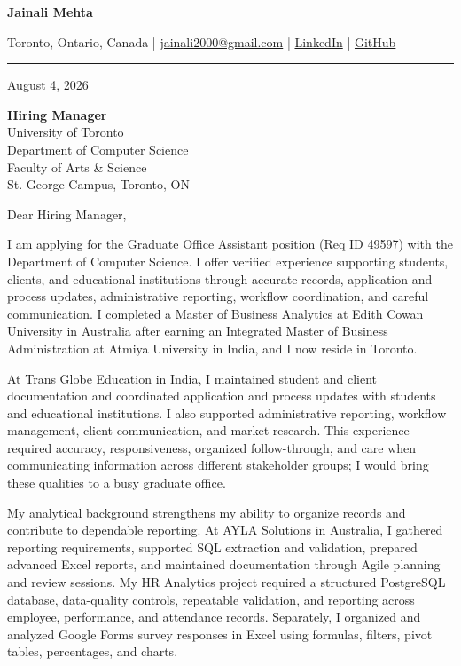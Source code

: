 \documentclass[letterpaper,10pt]{article}
\begin{document}
\begin{center}
  {\fontsize{17}{19}\selectfont\textbf{Jainali Mehta}}\par\vspace{2pt}
  \small Toronto, Ontario, Canada \;|\;
  \href{mailto:jainali2000@gmail.com}{jainali2000@gmail.com} \;|\;
  \href{https://www.linkedin.com/in/jainali-mehta}{LinkedIn} \;|\;
  \href{https://github.com/jainalimehta}{GitHub}
\end{center}
\vspace{-5pt}
\noindent\rule{\textwidth}{0.4pt}

August 4, 2026

\textbf{Hiring Manager}\\
University of Toronto\\
Department of Computer Science\\
Faculty of Arts \& Science\\
St. George Campus, Toronto, ON

Dear Hiring Manager,

I am applying for the Graduate Office Assistant position (Req ID 49597) with the Department of Computer Science. I offer verified experience supporting students, clients, and educational institutions through accurate records, application and process updates, administrative reporting, workflow coordination, and careful communication. I completed a Master of Business Analytics at Edith Cowan University in Australia after earning an Integrated Master of Business Administration at Atmiya University in India, and I now reside in Toronto.

At Trans Globe Education in India, I maintained student and client documentation and coordinated application and process updates with students and educational institutions. I also supported administrative reporting, workflow management, client communication, and market research. This experience required accuracy, responsiveness, organized follow-through, and care when communicating information across different stakeholder groups; I would bring these qualities to a busy graduate office.

My analytical background strengthens my ability to organize records and contribute to dependable reporting. At AYLA Solutions in Australia, I gathered reporting requirements, supported SQL extraction and validation, prepared advanced Excel reports, and maintained documentation through Agile planning and review sessions. My HR Analytics project required a structured PostgreSQL database, data-quality controls, repeatable validation, and reporting across employee, performance, and attendance records. Separately, I organized and analyzed Google Forms survey responses in Excel using formulas, filters, pivot tables, percentages, and charts.
\end{document}
